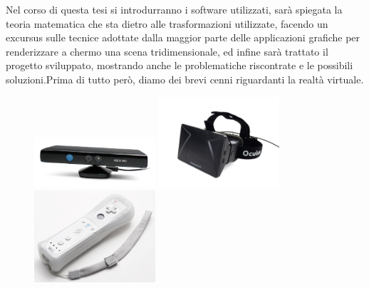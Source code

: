 Nel corso di questa tesi si introdurranno i software utilizzati, sarà spiegata la teoria matematica che sta dietro alle trasformazioni utilizzate, facendo un excursus sulle tecnice adottate dalla maggior parte delle applicazioni grafiche per renderizzare a chermo una scena tridimensionale, ed infine sarà trattato il progetto sviluppato, mostrando anche le problematiche riscontrate e le possibili soluzioni.Prima di tutto però, diamo dei brevi cenni riguardanti la realtà virtuale.

\begin{figure}[htbp]
\centering
\includegraphics[width=0.4\textwidth]{images/intro/kinect.png}
\includegraphics[width=0.4\textwidth]{images/intro/oculus-rift.jpg}
\includegraphics[width=0.4\textwidth]{images/intro/wii.jpg}
\end{figure}

